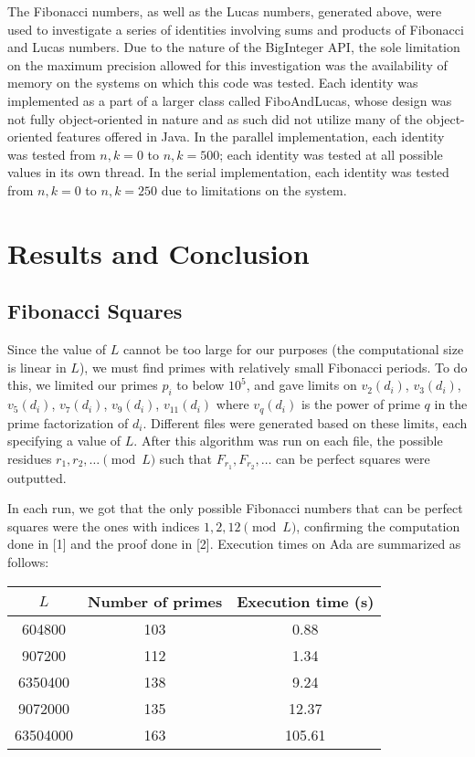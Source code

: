\documentclass[11pt]{article}
\begin{document}
The Fibonacci numbers, as well as the Lucas numbers, generated above, were used to investigate a series of identities involving sums and products of Fibonacci and Lucas numbers. Due to the nature of the BigInteger API, the sole limitation on the maximum precision allowed for this investigation was the availability of memory on the systems on which this code was tested. Each identity was implemented as a part of a larger class called FiboAndLucas, whose design was not fully object-oriented in nature and as such did not utilize many of the object-oriented features offered in Java. In the parallel implementation, each identity was tested from $n, k = 0$ to $n, k = 500$; each identity was tested at all possible values in its own thread. In the serial implementation, each identity was tested from $n,k = 0$ to $n,k = 250$ due to limitations on the system.
\section{Results and Conclusion}
\subsection{Fibonacci Squares}
Since the value of $L$ cannot be too large for our purposes (the computational size is linear in $L$), we must find primes with relatively small Fibonacci periods. To do this, we limited our primes $p_i$ to below $10^5$, and gave limits on $v_2(d_i)$, $v_3(d_i)$, $v_5(d_i)$, $v_7(d_i)$, $v_9(d_i)$, $v_{11}(d_i)$ where $v_q(d_i)$ is the power of prime $q$ in the prime factorization of $d_i$. Different files were generated based on these limits, each specifying a value of $L$. After this algorithm was run on each file, the possible residues $r_1, r_2, \dots \pmod L$ such that $F_{r_1}, F_{r_2}, \dots$ can be perfect squares were outputted.

In each run, we got that the only possible Fibonacci numbers that can be perfect squares were the ones with indices $1, 2, 12 \pmod{L}$, confirming the computation done in [1] and the proof done in [2]. Execution times on Ada are summarized as follows:

\begin{tabular}{ccc}
\hline
$L$ & Number of primes & Execution time (s) \\ \hline
604800 & 103 & 0.88 \\
907200 & 112 & 1.34 \\
6350400 & 138 & 9.24 \\
9072000 & 135 & 12.37 \\
63504000 & 163 & 105.61 \\ \hline \hline
\end{tabular}
\end{document}

